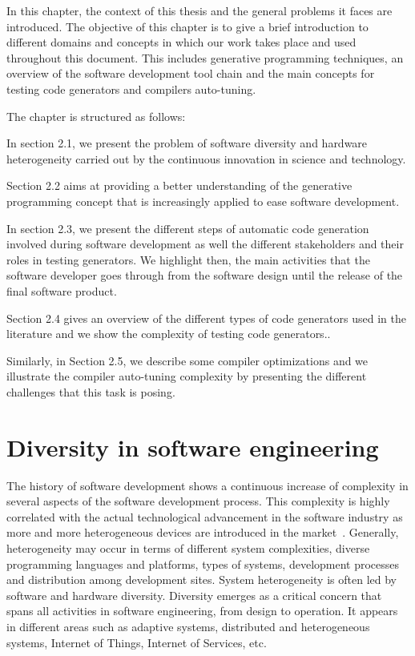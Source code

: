  
In this chapter, the context of this thesis and the general problems it faces are introduced. The objective of this chapter is to give a brief introduction to  different domains and concepts in which our work takes place and used throughout this document.
This includes generative programming techniques, an overview of the software development tool chain and the main concepts for testing code generators and compilers auto-tuning.


The chapter is structured as follows: 

In section 2.1, we present the problem of software diversity and hardware heterogeneity carried out by the continuous innovation in science and technology.

Section 2.2 aims at providing a better understanding of the generative programming concept that is increasingly applied to ease software development. 

In section 2.3, we present the different steps of automatic code generation involved during software development as well the different stakeholders and their roles in testing generators. We highlight then, the main activities that the software developer goes through from the software design until the release of the final software product.

Section 2.4 gives an overview of the different types of code generators used in the literature and we show the complexity of testing code generators.. 

Similarly, in Section 2.5, we describe some compiler optimizations and we illustrate the compiler auto-tuning complexity by presenting the different challenges that this task is posing.


\section{Diversity in software engineering}
The history of software development shows a continuous increase of complexity in several aspects of the software development process. This complexity is highly correlated with the actual technological advancement in the software industry as more and more heterogeneous devices are introduced in the market~\cite{betz2011improving}. 
Generally, heterogeneity may occur in terms of different system complexities, diverse programming languages and platforms, types of systems, development processes and distribution among development sites\cite{ghazi2015heterogeneous}.
System heterogeneity is often led by software and hardware diversity.
Diversity emerges as a critical concern that spans all activities in software engineering, from design to operation\cite{acher2014software}. It appears in different areas such as adaptive systems, distributed and heterogeneous systems, Internet of Things, Internet of Services, etc.

